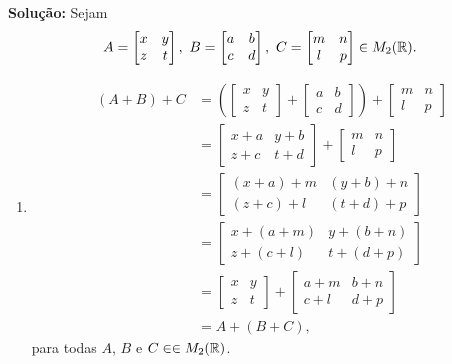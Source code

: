\documentclass[12pt]{exam}
\begin{document}
\noindent\textbf{Solu\c{c}\~ao:} Sejam
\[
    A = \begin{bmatrix}
        x & y\\
        z & t
    \end{bmatrix},\ 
    B = \begin{bmatrix}
        a & b\\
        c & d
    \end{bmatrix},\ 
    C = \begin{bmatrix}
        m & n\\
        l & p
    \end{bmatrix} \in M_2(\real).
\]
\begin{enumerate}[label={\roman*})]
    \item
    \begin{align*}
        (A + B) + C &= \left(\begin{bmatrix}
        x & y\\z & t 
    \end{bmatrix} + \begin{bmatrix}
        a & b\\c & d 
    \end{bmatrix}\right) + \begin{bmatrix}
        m & n\\l & p 
    \end{bmatrix}\\ &= \begin{bmatrix}
        x + a & y + b\\z + c & t + d 
    \end{bmatrix} + \begin{bmatrix}
        m & n\\l & p 
    \end{bmatrix}\\ &= \begin{bmatrix}
        (x + a) + m & (y + b) + n\\(z + c) + l & (t + d) + p 
    \end{bmatrix}\\ &= \begin{bmatrix}
        x + (a + m) & y + (b + n)\\z + (c + l) & t + (d + p) 
    \end{bmatrix} \\&= \begin{bmatrix}
        x & y\\
        z & t
    \end{bmatrix} + \begin{bmatrix}
        a + m & b + n\\c + l & d + p 
    \end{bmatrix}\\ &= A + (B + C),
    \end{align*}
    para todas $A$, $B$ e $C \in \in M_2(\mathbb{R})$.


\end{enumerate}
\end{document}
